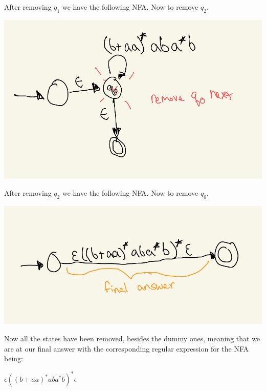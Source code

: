 \documentclass[11pt, letterpaper]{article}
\begin{document}
\vspace{5mm}

\noindent After removing $q_1$ we have the following NFA. Now to remove $q_2$.

\vspace{5mm}

\noindent\includegraphics[width=\textwidth]{second-dfa}

\vspace{5mm}

\noindent After removing $q_2$ we have the following NFA. Now to remove $q_0$.

\vspace{5mm}

\noindent\includegraphics[width=\textwidth]{third-dfa}

\vspace{5mm}

\noindent Now all the states have been removed, besides the dummy ones, meaning that we are at our final answer with the corresponding regular expression for the NFA being:

\vspace{5mm}

\LARGE\noindent \textbf{$\epsilon ((b+aa)^*aba^*b)^* \epsilon$}
\end{document}
